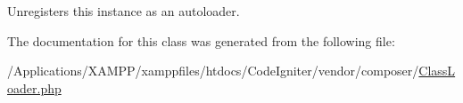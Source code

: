 Unregisters this instance as an autoloader. 

The documentation for this class was generated from the following file\+:\begin{DoxyCompactItemize}
\item 
/\+Applications/\+X\+A\+M\+P\+P/xamppfiles/htdocs/\+Code\+Igniter/vendor/composer/\mbox{\hyperlink{_class_loader_8php}{Class\+Loader.\+php}}\end{DoxyCompactItemize}
